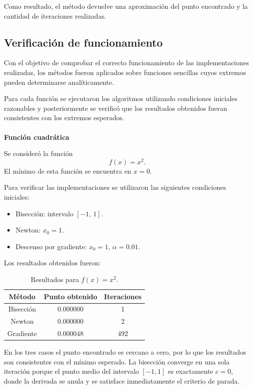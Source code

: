 \documentclass[12pt]{article}
\begin{document}
Como resultado, el método devuelve una aproximación del punto encontrado y la cantidad de iteraciones realizadas.


\subsection{Verificación de funcionamiento}

Con el objetivo de comprobar el correcto funcionamiento de las implementaciones realizadas, los métodos fueron aplicados sobre funciones sencillas cuyos extremos pueden determinarse analíticamente.

Para cada función se ejecutaron los algoritmos utilizando condiciones iniciales razonables y posteriormente se verificó que los resultados obtenidos fueran consistentes con los extremos esperados.\\
\\

\textbf{Función cuadrática}

Se consideró la función
\[
f(x) = x^2.
\]
El mínimo de esta función se encuentra en $x = 0$.

Para verificar las implementaciones se utilizaron las siguientes condiciones iniciales:

\begin{itemize}
    \item Bisección: intervalo $[-1,\, 1]$.
    \item Newton: $x_0 = 1$.
    \item Descenso por gradiente: $x_0 = 1$, $\alpha = 0.01$.
\end{itemize}

Los resultados obtenidos fueron:

\begin{table}[h]
\centering
\begin{tabular}{ccc}
\hline
Método & Punto obtenido & Iteraciones \\
\hline
Bisección & $0.000000$ & 1  \\
Newton    & $0.000000$ & 2  \\
Gradiente & $0.000048$ & 492 \\
\hline
\end{tabular}
\caption{Resultados para $f(x)=x^2$.}
\end{table}

En los tres casos el punto encontrado es cercano a cero, por lo que los resultados son consistentes con el mínimo esperado. La bisección converge en una sola iteración porque el punto medio del intervalo $[-1,1]$ es exactamente $c=0$, donde la derivada se anula y se satisface inmediatamente el criterio de parada.\\
\end{document}
